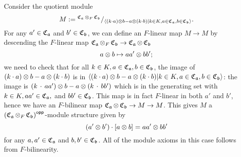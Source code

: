 \begin{construction}[$M$]
  Consider the quotient module
  \[M := {}^{\cross_{\mfa}\ox_{F}\cross_{\mfb}}/_{\left\langle (k\cdot a)\ox b - a \ox (k\cdot b) | k \in K, a \in \cross_{\mfa}, b \in \cross_{\mfb} \right\rangle}.\]
  For any $a' \in \cross_{\mfa}$ and $b' \in \cross_{\mfb}$, we can define an $F$-linear map $M \to M$ by descending the $F$-linear map
$\cross_{\mfa}\ox_{F}\cross_{\mfb} \to \cross_{\mfa}\ox \cross_{\mfb}$
  \[
      a\ox b \mapsto aa' \ox bb';
    \]
    we need to check that for all $k \in K, a \in \cross_{\mfa}, b \in \cross_{\mfb}$, the image of $(k\cdot a)\ox b - a\ox(k\cdot b)$ is in $\left\langle (k\cdot a)\ox b - a \ox (k\cdot b) | k \in K, a \in \cross_{\mfa}, b \in \cross_{\mfb} \right\rangle$:
    the image is $(k\,\cdot\, aa')\ox b - a\ox(k\,\cdot\, bb')$ which is in the generating set with $k \in K, aa' \in\cross_{\mfa}, $ and $bb'\in\cross_{\mfb}$.
  This map is in fact $F$-linear in both $a'$ and $b'$, hence we have an $F$-bilinear map $\cross_{\mfa}\ox\cross_{\mfb} \to M \to M$.
  This gives $M$ a $\left(\cross_{\mfa}\ox_{F}\cross_{\mfb}\right)^{\opp}$-module structure given by
  \[
    (a' \ox b') \cdot [a\ox b] = aa' \ox bb'
  \]
  for any $a,a' \in \cross_{\mfa}$ and $b, b' \in\cross_{\mfb}$. All of the module axioms in this case follows from $F$-bilinearity.



\end{construction}
